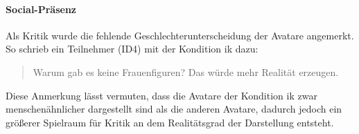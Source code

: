 \documentclass[a4paper,11pt]{article}%
\renewcommand{\\}{\vspace*{0.5\baselineskip} \newline}
\begin{document}
{{\paragraph{Social-Präsenz} Als Kritik wurde die fehlende Geschlechterunterscheidung der Avatare angemerkt. So schrieb ein Teilnehmer (ID4) mit der Kondition \ac{ik} dazu:
\begin{quote}
\glqq{}Warum gab es keine Frauenfiguren? Das würde mehr Realität erzeugen.\dq{}
\end{quote}
Diese Anmerkung lässt vermuten, dass die Avatare der Kondition \ac{ik} zwar menschenähnlicher dargestellt sind als die anderen Avatare, dadurch jedoch ein größerer Spielraum für Kritik an dem Realitätsgrad der Darstellung entsteht.

%
%
%
}}
\end{document}

